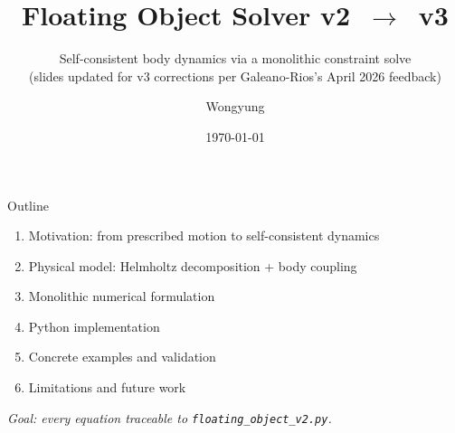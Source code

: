 \documentclass[aspectratio=169, 10pt]{beamer}
\title{Floating Object Solver \texorpdfstring{v2~$\to$~v3}{v2 -> v3}}
\subtitle{Self-consistent body dynamics via a monolithic constraint solve\\
\small (slides updated for v3 corrections per Galeano-Rios's April 2026 feedback)}
\author{Wongyung}
\institute{LNS Floating Project}
\date{\today}
\begin{document}
\frame{\titlepage}

\begin{frame}{Outline}
\begin{enumerate}
    \item Motivation: from prescribed motion to self-consistent dynamics
    \item Physical model: Helmholtz decomposition + body coupling
    \item Monolithic numerical formulation
    \item Python implementation
    \item Concrete examples and validation
    \item Limitations and future work
\end{enumerate}
\vspace{1em}
\small\textit{Goal: every equation traceable to \texttt{floating\_object\_v2.py}.}
\end{frame}

\end{document}
